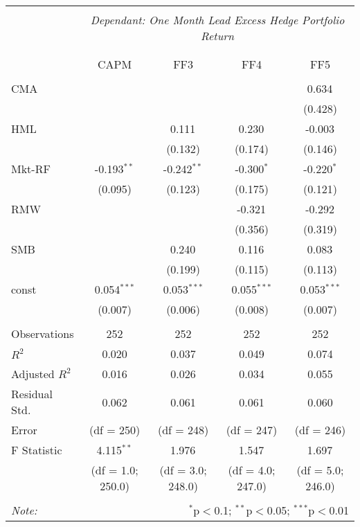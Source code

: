 \begin{table}[H] \centering
\begin{tabular}{@{\extracolsep{5pt}}lcccc}
\\[-1.8ex]\hline
\hline \\[-1.8ex]
& \multicolumn{4}{c}{\textit{Dependant: One Month Lead Excess Hedge Portfolio Return}}\\
\hline \\[-1.8ex]
\\[-1.8ex] & CAPM & FF3 & FF4 & FF5 \\
\hline \\[-1.8ex]
 CMA & & & & 0.634$^{}$ \\
  & & & & (0.428) \\
 HML & & 0.111$^{}$ & 0.230$^{}$ & -0.003$^{}$ \\
  & & (0.132) & (0.174) & (0.146) \\
 Mkt-RF & -0.193$^{**}$ & -0.242$^{**}$ & -0.300$^{*}$ & -0.220$^{*}$ \\
  & (0.095) & (0.123) & (0.175) & (0.121) \\
 RMW & & & -0.321$^{}$ & -0.292$^{}$ \\
  & & & (0.356) & (0.319) \\
 SMB & & 0.240$^{}$ & 0.116$^{}$ & 0.083$^{}$ \\
  & & (0.199) & (0.115) & (0.113) \\
 const & 0.054$^{***}$ & 0.053$^{***}$ & 0.055$^{***}$ & 0.053$^{***}$ \\
  & (0.007) & (0.006) & (0.008) & (0.007) \\
\hline \\[-1.8ex]
 Observations & 252 & 252 & 252 & 252 \\
 $R^2$ & 0.020 & 0.037 & 0.049 & 0.074 \\
 Adjusted $R^2$ & 0.016 & 0.026 & 0.034 & 0.055 \\
 Residual Std. & 0.062 & 0.061 & 0.061 & 0.060  \\
 Error  & (df = 250) & (df = 248) & (df = 247) & (df = 246)  \\
 F Statistic & 4.115$^{**}$  & 1.976$^{}$  & 1.547$^{}$  & 1.697$^{}$  \\
&  (df = 1.0; 250.0) &  (df = 3.0; 248.0) &  (df = 4.0; 247.0) & (df = 5.0; 246.0) \\
\hline
\hline \\[-1.8ex]
\textit{Note:} & \multicolumn{4}{r}{$^{*}$p$<$0.1; $^{**}$p$<$0.05; $^{***}$p$<$0.01} \\
\end{tabular}
\end{table}

